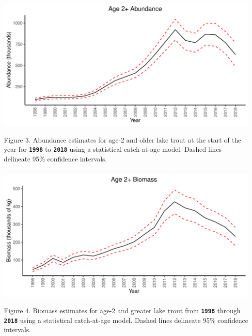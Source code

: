 \documentclass[
]{article}
\begin{document}
\hypertarget{fig3}{%
\subsubsection{}\label{fig3}}

\includegraphics{Yellowstone-import-code_files/figure-latex/unnamed-chunk-3-1.pdf}

Figure 3. Abundance estimates for age-2 and older lake trout at the
start of the year for \textbf{\texttt{1998}} to \textbf{\texttt{2018}}
using a statistical catch-at-age model. Dashed lines delineate 95\%
confidence intervals. \pagebreak

\hypertarget{fig4}{%
\subsubsection{}\label{fig4}}

\includegraphics{Yellowstone-import-code_files/figure-latex/unnamed-chunk-4-1.pdf}

Figure 4. Biomass estimates for age-2 and greater lake trout from
\textbf{\texttt{1998}} through \textbf{\texttt{2018}} using a
statistical catch-at-age model. Dashed lines delineate 95\% confidence
intervals. \newline \newline \newline 
\end{document}
